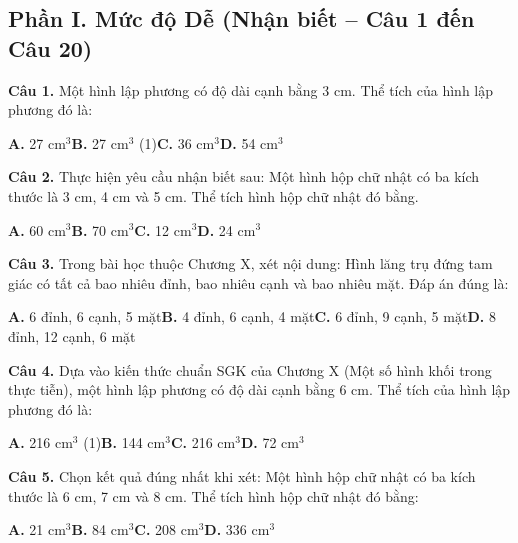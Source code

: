 \documentclass[11pt,a4paper]{article}
\begin{document}
\subsection*{\color{accent} Phần I. Mức độ Dễ (Nhận biết -- Câu 1 đến Câu 20)}
\textbf{\color{primary} Câu 1.} Một hình lập phương có độ dài cạnh bằng 3 cm. Thể tích của hình lập phương đó là:\par
\hspace*{1.5em}\textbf{A.} 27 cm$^3$\quad\quad \textbf{B.} 27 cm$^3$ (1)\quad\quad \textbf{C.} 36 cm$^3$\quad\quad \textbf{D.} 54 cm$^3$\par\vspace{2pt}
\textbf{\color{primary} Câu 2.} Thực hiện yêu cầu nhận biết sau: Một hình hộp chữ nhật có ba kích thước là 3 cm, 4 cm và 5 cm. Thể tích hình hộp chữ nhật đó bằng.\par
\hspace*{1.5em}\textbf{A.} 60 cm$^3$\quad\quad \textbf{B.} 70 cm$^3$\quad\quad \textbf{C.} 12 cm$^3$\quad\quad \textbf{D.} 24 cm$^3$\par\vspace{2pt}
\textbf{\color{primary} Câu 3.} Trong bài học thuộc Chương X, xét nội dung: Hình lăng trụ đứng tam giác có tất cả bao nhiêu đỉnh, bao nhiêu cạnh và bao nhiêu mặt. Đáp án đúng là:\par
\hspace*{1.5em}\textbf{A.} 6 đỉnh, 6 cạnh, 5 mặt\quad\quad \textbf{B.} 4 đỉnh, 6 cạnh, 4 mặt\quad\quad \textbf{C.} 6 đỉnh, 9 cạnh, 5 mặt\quad\quad \textbf{D.} 8 đỉnh, 12 cạnh, 6 mặt\par\vspace{2pt}
\textbf{\color{primary} Câu 4.} Dựa vào kiến thức chuẩn SGK của Chương X (Một số hình khối trong thực tiễn), một hình lập phương có độ dài cạnh bằng 6 cm. Thể tích của hình lập phương đó là:\par
\hspace*{1.5em}\textbf{A.} 216 cm$^3$ (1)\quad\quad \textbf{B.} 144 cm$^3$\quad\quad \textbf{C.} 216 cm$^3$\quad\quad \textbf{D.} 72 cm$^3$\par\vspace{2pt}
\textbf{\color{primary} Câu 5.} Chọn kết quả đúng nhất khi xét: Một hình hộp chữ nhật có ba kích thước là 6 cm, 7 cm và 8 cm. Thể tích hình hộp chữ nhật đó bằng:\par
\hspace*{1.5em}\textbf{A.} 21 cm$^3$\quad\quad \textbf{B.} 84 cm$^3$\quad\quad \textbf{C.} 208 cm$^3$\quad\quad \textbf{D.} 336 cm$^3$\par\vspace{2pt}
\end{document}
